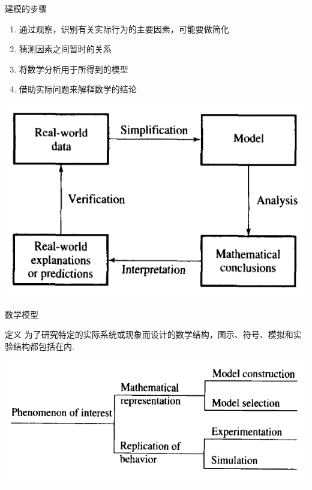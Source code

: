 \documentclass[mathserif]{beamer}
\begin{document}
\begin{frame}{建模的步骤}

  \begin{enumerate}
  \item 通过观察，识别有关实际行为的主要因素，可能要做简化
  \item 猜测因素之间暂时的关系
  \item 将数学分析用于所得到的模型
  \item 借助实际问题来解释数学的结论
  \end{enumerate}

  \begin{center}
    \includegraphics[width=.5\textwidth{}]{mmstep.png}
  \end{center}
\end{frame}

\begin{frame}{数学模型}

  \begin{block}{定义}
    为了研究特定的实际系统或现象而设计的数学结构，图示、符号、模拟和实验结构都包括在内.
  \end{block}

  \begin{center}
    \includegraphics[width=.6\textwidth{}]{modelprop.png}
  \end{center}
  
\end{frame}
\end{document}
